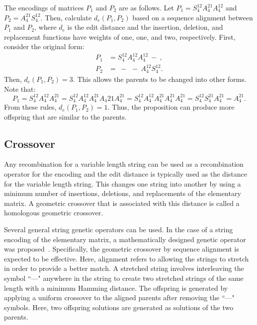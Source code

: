 The encodings of matrices $ P_1 $ and $ P_2 $ are as follows. Let $ P_1=S_4^{12}A_4^{21}A_4^{12} $ and $ P_2=A_4^{21}S_4^{12} $. Then, calculate $ d_e\left(P_1,P_2\right) $ based on a sequence alignment between $ P_1 $ and $ P_2 $, where $ d_e $ is the edit distance and the insertion, deletion, and replacement functions have weights of one, one, and two, respectively. First, consider the original form:
\begin{align*}
P_1&=S_4^{12}A_4^{12}A_4^{12}\ -\ , \\
P_2&=\ -\ \ -\ A_4^{12}S_4^{12}.
\end{align*}
Then, $ d_e\left(P_1,P_2\right)=3 $. This allows the parents to be changed into other forms. Note that:
\begin{equation*}
P_1=S_4^{12} A_4^{12} A_4^{21} = S_4^{12} A_4^{12} A_4^{21} A_4{21} A_4^{21} = S_4^{12} A_4^{12} A_4^{21} A_4^{21} A_4^{21} = S_4^{12} S_4^{21} A_4^{21} = A_4^{21}.    		
\end{equation*}
From these rules, $ d_e\left(P_1,P_2\right) = 1 $. Thus, the proposition can produce more offspring that are similar to the parents.

\subsection{Crossover} \label{sec52:crossover}
Any recombination for a variable length string can be used as a recombination operator for the encoding and the edit distance is typically used as the distance for the variable length string. This changes one string into another by using a minimum number of insertions, deletions, and replacements of the elementary matrix. A geometric crossover that is associated with this distance is called a homologous geometric crossover.

Several general string genetic operators can be used. In the case of a string encoding of the elementary matrix, a mathematically designed genetic operator was proposed~\cite{yoon2014mathematical}. Specifically, the geometric crossover by sequence alignment is expected to be effective. Here, alignment refers to allowing the strings to stretch in order to provide a better match. A stretched string involves interleaving the symbol ``—" anywhere in the string to create two stretched strings of the same length with a minimum Hamming distance. The offspring is generated by applying a uniform crossover to the aligned parents after removing the ``—" symbols. Here, two offspring solutions are generated as solutions of the two parents.

